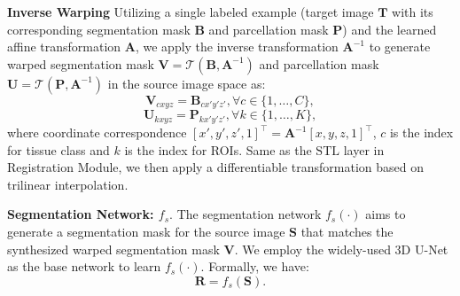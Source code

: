 \vspace{1pt}
\noindent \textbf{Inverse Warping} Utilizing a single labeled example (\ie target image $\mathbf{T}$ with its corresponding segmentation mask $\mathbf{B}$ and parcellation mask $\mathbf{P}$) and the learned affine transformation $\mathbf{A}$, we apply the inverse transformation $\mathbf{A}^{-1}$ to generate warped segmentation mask $\mathbf{V} = \mathcal{T}(\mathbf{B}, \mathbf{A}^{-1})$ and parcellation mask $\mathbf{U} = \mathcal{T}(\mathbf{P}, \mathbf{A}^{-1})$ in the source image space as:
\begin{equation}
    \mathbf{V}_{cxyz} = \mathbf{B}_{cx'y'z'}, \forall  c \in \{1 ,\ldots, C\},
\end{equation}
\begin{equation}
    \mathbf{U}_{kxyz} = \mathbf{P}_{kx'y'z'}, \forall  k \in \{1 ,\ldots, K\},
\end{equation}
where coordinate correspondence $[x', y', z', 1]^\top = \mathbf{A}^{-1}[x, y, z, 1]^\top $, $c$ is the index for tissue class and $k$ is the index for ROIs. Same as the $\text{STL}$ layer in Registration Module, we then apply a differentiable transformation based on trilinear interpolation. 

\vspace{1pt}
\noindent \textbf{Segmentation Network: $f_s$}. The segmentation network $f_s(\cdot)$ aims to generate a segmentation mask for the source image $\mathbf{S}$ that 
matches the synthesized warped segmentation mask $\mathbf{V}$. We employ the widely-used 3D U-Net as the base network to learn $f_s(\cdot)$. Formally, we have:
\begin{equation}
    \mathbf{R} = f_s(\mathbf{S}).
\end{equation}


